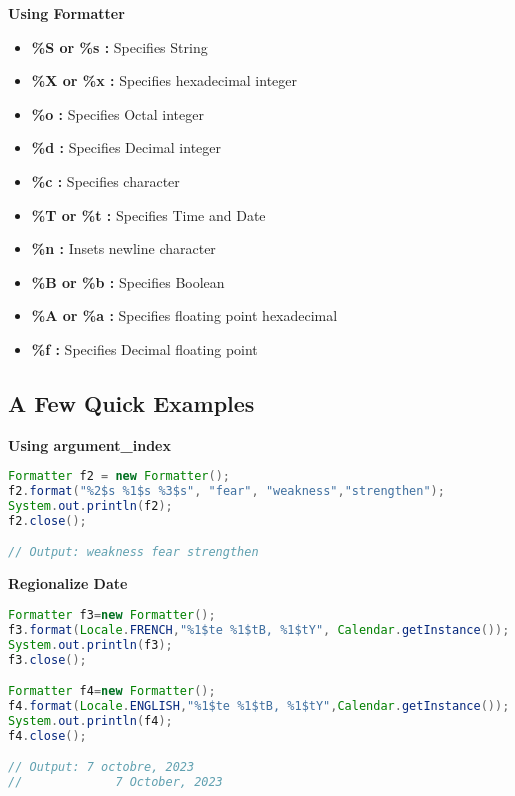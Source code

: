 \textbf{Using Formatter}
\begin{itemize}
	\item \textbf{\%S or \%s :} Specifies String
	\item \textbf{\%X or \%x :} Specifies hexadecimal integer
	\item \textbf{\%o :} Specifies Octal integer
	\item \textbf{\%d :} Specifies Decimal integer
	\item \textbf{\%c :} Specifies character
	\item \textbf{\%T or \%t :} Specifies Time and Date
	\item \textbf{\%n :} Insets newline character
	\item \textbf{\%B or \%b :} Specifies Boolean
	\item \textbf{\%A or \%a :} Specifies floating point hexadecimal
	\item \textbf{\%f :} Specifies Decimal floating point\\
\end{itemize}

\newpage
\subsection{A Few Quick Examples}

\textbf{Using argument\_index}

\begin{lstlisting}[language=java]
Formatter f2 = new Formatter();
f2.format("%2$s %1$s %3$s", "fear", "weakness","strengthen");
System.out.println(f2);
f2.close();

// Output: weakness fear strengthen		
\end{lstlisting}


\textbf{Regionalize Date}

\begin{lstlisting}[language=java]
Formatter f3=new Formatter();
f3.format(Locale.FRENCH,"%1$te %1$tB, %1$tY", Calendar.getInstance());
System.out.println(f3);
f3.close();

Formatter f4=new Formatter();
f4.format(Locale.ENGLISH,"%1$te %1$tB, %1$tY",Calendar.getInstance());
System.out.println(f4);
f4.close();

// Output: 7 octobre, 2023
//  		   7 October, 2023		
\end{lstlisting}



